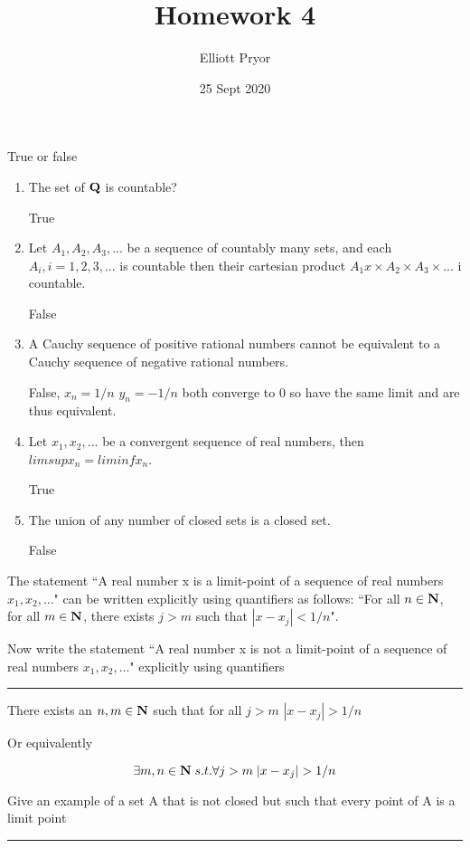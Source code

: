 \documentclass[11pt]{article}
\title{Homework 4}
\author{Elliott Pryor}
\date{25 Sept 2020}
\begin{document}
\maketitle

True or false

\begin{enumerate}
	\item The set of $\mathbf{Q}$ is countable? 
	
	True
	
	\item Let $A_1, A_2, A_3, ...$ be a sequence of countably many sets, and each $A_i, i = 1,2,3,...$ is countable then their cartesian product $A_1 x \times A_2 \times A_3 \times ...$ i countable.
	
	False
	
	\item A Cauchy sequence of positive rational numbers cannot be equivalent to a Cauchy sequence of negative rational numbers.
	
	False, $x_n = 1/n$ $y_n = -1/n$ both converge to 0 so have the same limit and are thus equivalent.
	
	\item Let $x_1, x_2, ...$ be a convergent sequence of real numbers, then $limsup x_n = liminf x_n$.
	
	True 
	
	\item The union of any number of closed sets is a closed set.
	
	False
	
\end{enumerate}

\newpage
{}
The statement ``A real number x is a limit-point of a sequence of real numbers $x_1, x_2, . . .$"
can be written explicitly using quantifiers as follows: ``For all $n \in \mathbf{N}$, for all $m \in \mathbf{N}$, there
exists $j > m$ such that $|x - x_j| < 1/n$". 

Now write the statement ``A real number x is
not a limit-point of a sequence of real numbers $x_1, x_2, ...$" explicitly using quantifiers
\hrule


There exists an $n, m \in \mathbf{N}$ such that for all $j > m$ $|x - x_j| > 1/n$

Or equivalently

$$\exists m, n \in \mathbf{N} \; s.t. \forall j > m \; |x - x_j| > 1/n$$


\newpage
{}
Give an example of a set A that is not closed but such that every point of A is a limit point
\hrule
\end{document}
